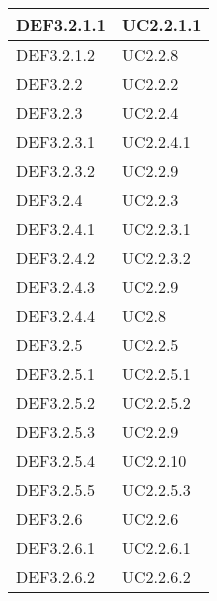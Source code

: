 \documentclass{scalatekids-article}
\begin{document}
\begin{longtable}[H]{|p{5.5cm}|p{5.5cm}|}
\hline
DEF3.2.1.1 & \multiLineCell[t]{UC2.2.1.1\\}\\
\hline
DEF3.2.1.2 & \multiLineCell[t]{UC2.2.8\\}\\
\hline
DEF3.2.2 & \multiLineCell[t]{UC2.2.2\\}\\
\hline
DEF3.2.3 & \multiLineCell[t]{UC2.2.4\\}\\
\hline
DEF3.2.3.1 & \multiLineCell[t]{UC2.2.4.1\\}\\
\hline
DEF3.2.3.2 & \multiLineCell[t]{UC2.2.9\\}\\
\hline
DEF3.2.4 & \multiLineCell[t]{UC2.2.3\\}\\
\hline
DEF3.2.4.1 & \multiLineCell[t]{UC2.2.3.1\\}\\
\hline
DEF3.2.4.2 & \multiLineCell[t]{UC2.2.3.2\\}\\
\hline
DEF3.2.4.3 & \multiLineCell[t]{UC2.2.9\\}\\
\hline
DEF3.2.4.4 & \multiLineCell[t]{UC2.8\\}\\
\hline
DEF3.2.5 & \multiLineCell[t]{UC2.2.5\\}\\
\hline
DEF3.2.5.1 & \multiLineCell[t]{UC2.2.5.1\\}\\
\hline
DEF3.2.5.2 & \multiLineCell[t]{UC2.2.5.2\\}\\
\hline
DEF3.2.5.3 & \multiLineCell[t]{UC2.2.9\\}\\
\hline
DEF3.2.5.4 & \multiLineCell[t]{UC2.2.10\\}\\
\hline
DEF3.2.5.5 & \multiLineCell[t]{UC2.2.5.3\\}\\
\hline
DEF3.2.6 & \multiLineCell[t]{UC2.2.6\\}\\
\hline
DEF3.2.6.1 & \multiLineCell[t]{UC2.2.6.1\\}\\
\hline
DEF3.2.6.2 & \multiLineCell[t]{UC2.2.6.2\\}\\

\end{longtable}
\end{document}
